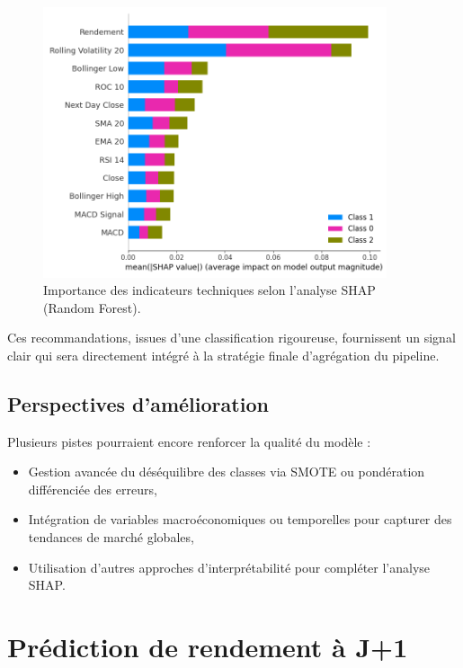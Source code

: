 \documentclass[a4paper,12pt]{article}
\begin{document}
\begin{figure}[h!]
    \centering
    \includegraphics[width=0.9\textwidth]{shap.png}
    \caption{Importance des indicateurs techniques selon l'analyse SHAP (Random Forest).}
    \label{fig:shap_classification}
\end{figure}

Ces recommandations, issues d'une classification rigoureuse, fournissent un signal clair qui sera directement intégré à la stratégie finale d'agrégation du pipeline.

\subsection*{Perspectives d'amélioration}

Plusieurs pistes pourraient encore renforcer la qualité du modèle :

\begin{itemize}
    \item Gestion avancée du déséquilibre des classes via SMOTE ou pondération différenciée des erreurs,
    \item Intégration de variables macroéconomiques ou temporelles pour capturer des tendances de marché globales,
    \item Utilisation d'autres approches d’interprétabilité pour compléter l’analyse SHAP.
\end{itemize}

\section{Prédiction de rendement à J+1}
\end{document}
